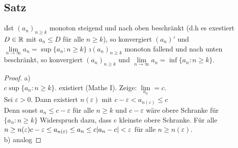 \subsection{Satz}
\begin{enumerate}[a)]
\i Ist $(a_n)_{n \geq k}$ monoton steigend und nach oben beschränkt (d.h es exestiert $D \in \mathbb{R}$ mit $a_n \leq D$ für alle $n \geq k$), so konvergiert $(a_n)'$ und $\lim\limits_{n \rightarrow \infty}a_n = \sup\{a_n: n\geq k \}$
\i $(a_n)_{n \geq k}$ monoton fallend und nach unten beschränkt, so konvergiert $(a_n)_{n \geq k}$ und $\lim\limits_{n \rightarrow \infty} a_n = \inf \{a_n: n\geq k \}.$
\begin{proof}
a)\\
$ c \sup \{a_n : n \geq k\}.$ existiert (Mathe I).
Zeige: $\lim\limits_{a_n} = c$.\\
Sei $\varepsilon > 0$. Dann existiert $n(\varepsilon)$ mit $c-\varepsilon < a_{n(\varepsilon)} \leq c$\\
Denn sonst $a_n \leq c - \varepsilon$ für alle $n \geq k$ und $c - \varepsilon$ wäre obere Schranke für $\{a_n : n \geq k \}$ Widerspruch dazu, dass c kleinste obere Schranke. Für alle $n \geq n(\varepsilon)\\
c- \varepsilon \leq a_{n(\varepsilon)} \leq a_n \leq c\\
\lvert a_n -c \rvert < \varepsilon$ für alle $n \geq n(\varepsilon).$\\
b) analog
\end{proof}
\end{enumerate}
